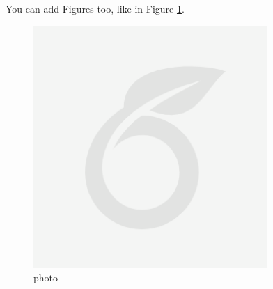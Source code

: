\vspace{0.1 in}
\noindent
You can add Figures too, like in Figure \ref{fig:imagelabel}. 

\begin{figure}[H] %
    \centering
    \includegraphics[width=3.5in]{Figures/LitRev/image.png}
    \caption{photo}
    \label{fig:imagelabel}
\end{figure}
